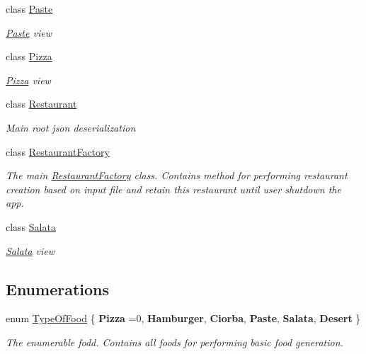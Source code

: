 \begin{DoxyCompactItemize}
class \hyperlink{classst_delivery_1_1_kitchen_1_1_paste}{Paste}
\begin{DoxyCompactList}\small\item\em \hyperlink{classst_delivery_1_1_kitchen_1_1_paste}{Paste} view \end{DoxyCompactList}\item 
class \hyperlink{classst_delivery_1_1_kitchen_1_1_pizza}{Pizza}
\begin{DoxyCompactList}\small\item\em \hyperlink{classst_delivery_1_1_kitchen_1_1_pizza}{Pizza} view \end{DoxyCompactList}\item 
class \hyperlink{classst_delivery_1_1_kitchen_1_1_restaurant}{Restaurant}
\begin{DoxyCompactList}\small\item\em Main root json deserialization \end{DoxyCompactList}\item 
class \hyperlink{classst_delivery_1_1_kitchen_1_1_restaurant_factory}{Restaurant\+Factory}
\begin{DoxyCompactList}\small\item\em The main \hyperlink{classst_delivery_1_1_kitchen_1_1_restaurant_factory}{Restaurant\+Factory} class. Contains method for performing restaurant creation based on input file and retain this restaurant until user shutdown the app. \end{DoxyCompactList}\item 
class \hyperlink{classst_delivery_1_1_kitchen_1_1_salata}{Salata}
\begin{DoxyCompactList}\small\item\em \hyperlink{classst_delivery_1_1_kitchen_1_1_salata}{Salata} view \end{DoxyCompactList}\end{DoxyCompactItemize}
\subsection*{Enumerations}
\begin{DoxyCompactItemize}
\item 
enum \hyperlink{namespacest_delivery_1_1_kitchen_a7c971dd83dd8457a7495309917619132}{Type\+Of\+Food} \{ \newline
{\bfseries Pizza} =0, 
{\bfseries Hamburger}, 
{\bfseries Ciorba}, 
{\bfseries Paste}, 
\newline
{\bfseries Salata}, 
{\bfseries Desert}
 \}\begin{DoxyCompactList}\small\item\em The enumerable fodd. Contains all foods for performing basic food generation. \end{DoxyCompactList}
\end{DoxyCompactItemize}


